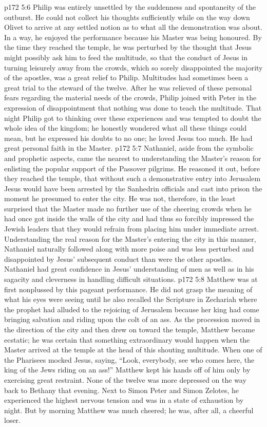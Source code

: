 \vs p172 5:6 \pc Philip was entirely unsettled by the suddenness and spontaneity of the outburst. He could not collect his thoughts sufficiently while on the way down Olivet to arrive at any settled notion as to what all the demonstration was about. In a way, he enjoyed the performance because his Master was being honoured. By the time they reached the temple, he was perturbed by the thought that Jesus might possibly ask him to feed the multitude, so that the conduct of Jesus in turning leisurely away from the crowds, which so sorely disappointed the majority of the apostles, was a great relief to Philip. Multitudes had sometimes been a great trial to the steward of the twelve. After he was relieved of these personal fears regarding the material needs of the crowds, Philip joined with Peter in the expression of disappointment that nothing was done to teach the multitude. That night Philip got to thinking over these experiences and was tempted to doubt the whole idea of the kingdom; he honestly wondered what all these things could mean, but he expressed his doubts to no one; he loved Jesus too much. He had great personal faith in the Master.
\vs p172 5:7 \pc Nathaniel, aside from the symbolic and prophetic aspects, came the nearest to understanding the Master’s reason for enlisting the popular support of the Passover pilgrims. He reasoned it out, before they reached the temple, that without such a demonstrative entry into Jerusalem Jesus would have been arrested by the Sanhedrin officials and cast into prison the moment he presumed to enter the city. He was not, therefore, in the least surprised that the Master made no further use of the cheering crowds when he had once got inside the walls of the city and had thus so forcibly impressed the Jewish leaders that they would refrain from placing him under immediate arrest. Understanding the real reason for the Master’s entering the city in this manner, Nathaniel naturally followed along with more poise and was less perturbed and disappointed by Jesus’ subsequent conduct than were the other apostles. Nathaniel had great confidence in Jesus’ understanding of men as well as in his sagacity and cleverness in handling difficult situations.
\vs p172 5:8 \pc Matthew was at first nonplussed by this pageant performance. He did not grasp the meaning of what his eyes were seeing until he also recalled the Scripture in Zechariah where the prophet had alluded to the rejoicing of Jerusalem because her king had come bringing salvation and riding upon the colt of an ass. As the procession moved in the direction of the city and then drew on toward the temple, Matthew became ecstatic; he was certain that something extraordinary would happen when the Master arrived at the temple at the head of this shouting multitude. When one of the Pharisees mocked Jesus, saying, “Look, everybody, see who comes here, the king of the Jews riding on an ass!” Matthew kept his hands off of him only by exercising great restraint. None of the twelve was more depressed on the way back to Bethany that evening. Next to Simon Peter and Simon Zelotes, he experienced the highest nervous tension and was in a state of exhaustion by night. But by morning Matthew was much cheered; he was, after all, a cheerful loser.
